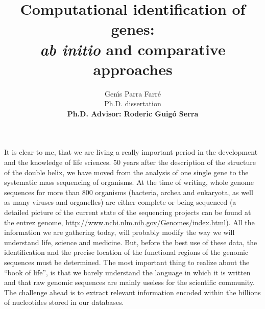 %
%
%








\thispagestyle{empty}


\title{{\Huge Computational identification of genes: \\[1ex] \textit{ab initio} and comparative approaches}\vspace{7.5cm}}


\author{
{\Large Gen\'{\i}s Parra Farr\'e}\\[1ex]
{\large Ph.D. dissertation}\\[2ex]
\textbf{Ph.D. Advisor: Roderic Guig\'o Serra}}



\maketitle                      %

\clearemptydoublepage



\newpage
{}
\setcounter{page}{1}
\newpage
{}

It is clear to me, that we are living a really important period in the
development and the knowledge of life sciences. 50 years after the
description of the structure of the double helix, we have moved from
the analysis of one single gene to the systematic mass sequencing of
organisms. At the time of writing, whole genome sequences for more
than 800 organisms (bacteria, archea and eukaryota, as well as many
viruses and organelles) are either complete or being sequenced (a
detailed picture of the current state of the sequencing projects can
be found at the entrez genome,
\url{http://www.ncbi.nlm.nih.gov/Genomes/index.html}). All the
information we are gathering today, will probably modify the way we
will understand life, science and medicine. But, before the best use
of these data, the identification and the precise location of the
functional regions of the genomic sequences must be determined. The
most important thing to realize about the ``book of life'', is that we
barely understand the language in which it is written and that raw
genomic sequences are mainly useless for the scientific community. The
challenge ahead is to extract relevant information encoded within the
billions of nucleotides stored in our databases.

